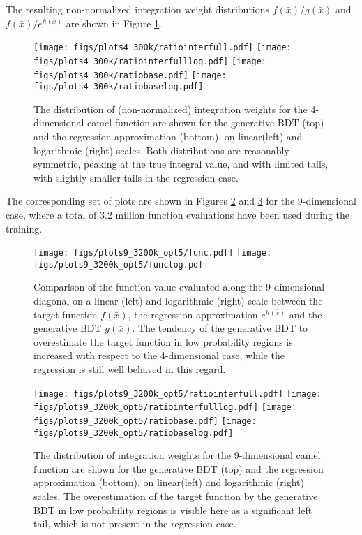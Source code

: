 \documentclass[a4paper,11pt]{article}
\begin{document}
The resulting non-normalized integration weight distributions $f(\bar x)/g(\bar x)$ and $f(\bar x)/e^{h(\bar x)}$ are shown in Figure \ref{fig:intweights4d}.

\begin{figure}[htb!]
\texttt{[image: figs/plots4\_300k/ratiointerfull.pdf]}
\texttt{[image: figs/plots4\_300k/ratiointerfulllog.pdf]}
\texttt{[image: figs/plots4\_300k/ratiobase.pdf]}
\texttt{[image: figs/plots4\_300k/ratiobaselog.pdf]}
\caption{The distribution of (non-normalized) integration weights for the 4-dimensional camel function are shown for the generative BDT (top) and the regression approximation (bottom), on linear(left) and logarithmic (right) scales.  Both distributions are reasonably symmetric, peaking at the true integral value, and with limited tails, with slightly smaller tails in the regression case.}
 \label{fig:intweights4d}
\end{figure}


The corresponding set of plots are shown in Figures \ref{fig:diag9d} and \ref{fig:intweights9d} for the 9-dimensional case, where a total of 3.2 million function evaluations have been used during the training.

\begin{figure}[htb!]
 \texttt{[image: figs/plots9\_3200k\_opt5/func.pdf]}
 \texttt{[image: figs/plots9\_3200k\_opt5/funclog.pdf]}
 \caption{Comparison of the function value evaluated along the 9-dimensional diagonal on a linear (left) and logarithmic (right) scale between the target function $f(\bar x)$, the regression approximation $e^{h(\bar x)}$ and the generative BDT $g(\bar x)$.  The tendency of the generative BDT to overestimate the target function in low probability regions is increased with respect to the 4-dimensional case, while the regression is still well behaved in this regard.}
 \label{fig:diag9d}
\end{figure}

\begin{figure}[htb!]
\texttt{[image: figs/plots9\_3200k\_opt5/ratiointerfull.pdf]}
\texttt{[image: figs/plots9\_3200k\_opt5/ratiointerfulllog.pdf]}
\texttt{[image: figs/plots9\_3200k\_opt5/ratiobase.pdf]}
\texttt{[image: figs/plots9\_3200k\_opt5/ratiobaselog.pdf]}
\caption{The distribution of integration weights for the 9-dimensional camel function are shown for the generative BDT (top) and the regression approximation (bottom), on linear(left) and logarithmic (right) scales.  The overestimation of the target function by the generative BDT in low probability regions is visible here as a significant left tail, which is not present in the regression case.}
 \label{fig:intweights9d}
\end{figure}
\end{document}

